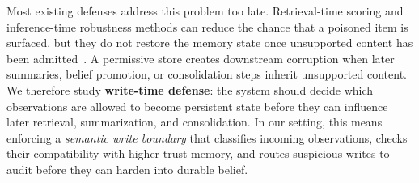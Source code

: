\documentclass{article}
\begin{document}
Most existing defenses address this problem too late. Retrieval-time scoring and inference-time robustness methods can reduce the chance that a poisoned item is surfaced, but they do not restore the memory state once unsupported content has been admitted~\cite{ref4,ref5,ref6,ref7}. A permissive store creates downstream corruption when later summaries, belief promotion, or consolidation steps inherit unsupported content. We therefore study \textbf{write-time defense}: the system should decide which observations are allowed to become persistent state before they can influence later retrieval, summarization, and consolidation. In our setting, this means enforcing a \emph{semantic write boundary} that classifies incoming observations, checks their compatibility with higher-trust memory, and routes suspicious writes to audit before they can harden into durable belief.
\end{document}
